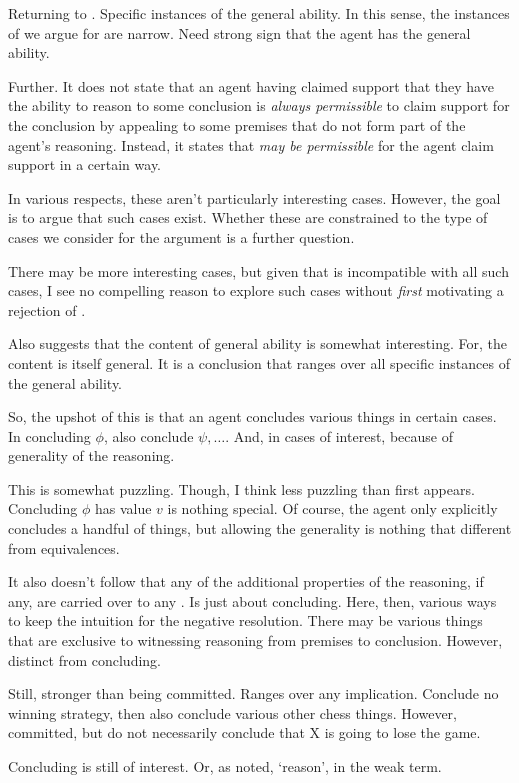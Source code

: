 \begin{note}
  Returning to \EAS{}.
  Specific instances of the general ability.
  In this sense, the instances of \EAS{} we argue for are narrow.
  Need strong sign that the agent has the general ability.

  Further.
  It does not state that an agent having claimed support that they have the ability to reason to some conclusion is \emph{always permissible} to claim support for the conclusion by appealing to some premises that do not form part of the agent's reasoning.
  Instead, it states that \emph{may be permissible} for the agent claim support in a certain way.

  In various respects, these aren't particularly interesting cases.
  However, the goal is to argue that such cases exist.
  Whether these are constrained to the type of cases we consider for the argument is a further question.

  There may be more interesting cases, but given that \ESU{} is incompatible with all such cases, I see no compelling reason to explore such cases without \emph{first} motivating a rejection of \ESU{}.
\end{note}

\begin{note}
  Also suggests that the content of general ability is somewhat interesting.
  For, the content is itself general.
  It is a conclusion that ranges over all specific instances of the general ability.
\end{note}

\begin{note}[Terminology]
  So, the upshot of this is that an agent concludes various things in certain cases.
  In concluding \(\phi\), also conclude \(\psi,\dots\).
  And, in cases of interest, because of generality of the reasoning.

  This is somewhat puzzling.
  Though, I think less puzzling than first appears.
  Concluding \(\phi\) has value \(v\) is nothing special.
  Of course, the agent only explicitly concludes a handful of things, but allowing the generality is nothing that different from equivalences.

  It also doesn't follow that any of the additional properties of the reasoning, if any, are carried over to any .
  Is just about concluding.
  Here, then, various ways to keep the intuition for the negative resolution.
  There may be various things that are exclusive to witnessing reasoning from premises to conclusion.
  However, distinct from concluding.

  Still, stronger than being committed.
  Ranges over any implication.
  Conclude no winning strategy, then also conclude various other chess things.
  However, committed, but do not necessarily conclude that X is going to lose the game.

  Concluding is still of interest.
  Or, as noted, `reason', in the weak term.
\end{note}

